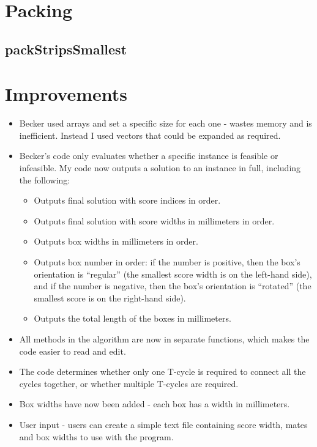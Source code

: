 \documentclass[a4paper, 11pt, twoside, onecolumn, openany]{article}
\begin{document}
\section{Packing}
\subsection{packStripsSmallest}




\section{Improvements}
\begin{itemize}
	\item Becker used arrays and set a specific size for each one - wastes memory and is inefficient. Instead I used vectors that could be expanded as required.
	\item Becker's code only evaluates whether a specific instance is feasible or infeasible. My code now outputs a solution to an instance in full, including the following:
	\begin{itemize}
		\item Outputs final solution with score indices in order.
		\item Outputs final solution with score widths in millimeters in order.
		\item Outputs box widths in millimeters in order.
		\item Outputs box number in order: if the number is positive, then the box's orientation is ``regular'' (the smallest score width is on the left-hand side), and if the number is negative, then the box's orientation is ``rotated'' (the smallest score is on the right-hand side).
		\item Outputs the total length of the boxes in millimeters.
	\end{itemize}
	\item All methods in the algorithm are now in separate functions, which makes the code easier to read and edit.
	\item The code determines whether only one T-cycle is required to connect all the cycles together, or whether multiple T-cycles are required. 
	\item Box widths have now been added - each box has a width in millimeters.
	\item User input - users can create a simple text file containing score width, mates and box widths to use with the program.
	
	
	
\end{itemize}
\end{document}
